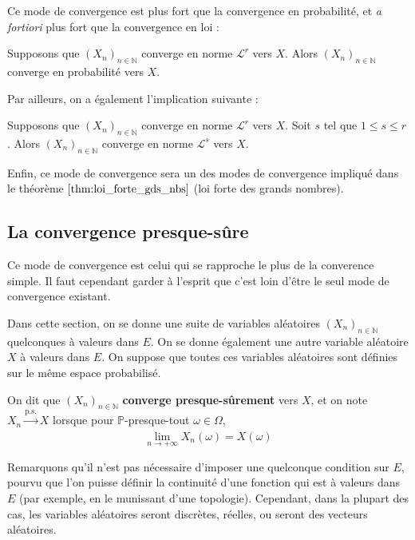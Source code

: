\documentclass[../integ-proba.tex]{subfiles}
\begin{document}
    Ce mode de convergence est plus fort que la convergence en probabilité, et \textit{a fortiori} plus fort que la convergence en loi :

    \begin{prop}
        Supposons que $\left(X_n\right)_{n\in\mathbb{N}}$ converge en norme $\mathcal{L}^r$ vers $X$.
        Alors $\left(X_n\right)_{n\in\mathbb{N}}$ converge en probabilité vers $X$.
    \end{prop}

    Par ailleurs, on a également l'implication suivante :

    \begin{prop}
        Supposons que $\left(X_n\right)_{n\in\mathbb{N}}$ converge en norme $\mathcal{L}^r$ vers $X$.
        Soit $s$ tel que $1 \leq s \leq r$.
        Alors $\left(X_n\right)_{n\in\mathbb{N}}$ converge en norme $\mathcal{L}^s$ vers $X$.
    \end{prop}

    \begin{rem}
        Enfin, ce mode de convergence sera un des modes de convergence impliqué dans le théorème $\ref{thm:loi_forte_gds_nbs}$ (loi forte des grands nombres).
    \end{rem}

    \subsection{La convergence presque-sûre}

    Ce mode de convergence est celui qui se rapproche le plus de la converence simple.
    Il faut cependant garder à l'esprit que c'est loin d'être le seul mode de convergence existant.

    Dans cette section, on se donne une suite de variables aléatoires $\left(X_n\right)_{n\in\mathbb{N}}$ quelconques à valeurs dans $E$.
    On se donne également une autre variable aléatoire $X$ à valeurs dans $E$.
    On suppose que toutes ces variables aléatoires sont définies sur le même espace probabilisé.

    \begin{defi}
        On dit que $\left(X_n\right)_{n\in\mathbb{N}}$ \textbf{converge presque-sûrement} vers $X$, et on note $X_n \xrightarrow[]{\text{p.s.}} X$ lorsque pour $\mathbb{P}$-presque-tout $\omega \in \Omega$,
        $$
        \lim_{n \to +\infty} X_n(\omega) = X(\omega)
        $$
    \end{defi}

    \begin{rem}
        Remarquons qu'il n'est pas nécessaire d'imposer une quelconque condition sur $E$, pourvu que l'on puisse définir la continuité d'une fonction qui est à valeurs dans $E$ (par exemple, en le munissant d'une topologie).
        Cependant, dans la plupart des cas, les variables aléatoires seront discrètes, réelles, ou seront des vecteurs aléatoires.
    \end{rem}
\end{document}
